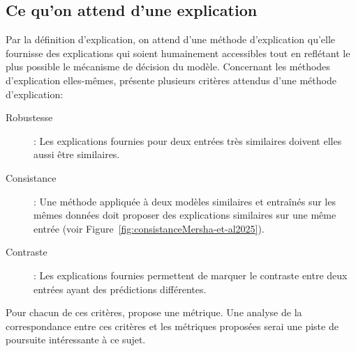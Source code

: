 \documentclass{report}
\newenvironment{comb}
    {\begin{color}{olive}
    }
    { 
    \end{color}
    }
\begin{document}
    \subsection{Ce qu'on attend d'une explication}
    \label{ssec:attendus}
    
    Par la définition d'explication, on attend d'une méthode d'explication qu'elle fournisse des explications qui soient humainement accessibles tout en reflétant le plus possible le mécanisme de décision du modèle. Concernant les méthodes d'explication elles-mêmes, \cite{mersha_evaluating_2025} présente plusieurs critères attendus d'une méthode d'explication:
    \begin{description}
        \item[Robustesse] : Les explications fournies pour deux entrées très similaires doivent elles aussi être similaires.
        \item[Consistance] : Une méthode appliquée à deux modèles similaires et entraînés sur les mêmes données doit proposer des explications similaires sur une même entrée (voir Figure~\ref{fig:consistanceMersha-et-al2025}).
        \item[Contraste] : Les explications fournies permettent de marquer le contraste entre deux entrées ayant des prédictions différentes. 
    \end{description}
    Pour chacun de ces critères, \cite{mersha_evaluating_2025} propose une métrique. Une analyse de la correspondance entre ces critères et les métriques proposées serai une piste de poursuite intéressante à ce sujet.
    
\end{document}
